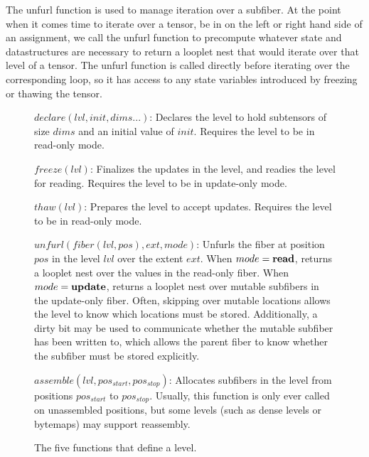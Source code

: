 The unfurl function is used to manage iteration over a subfiber. 
%
At the point when it comes time to iterate over a tensor, be in on the left or right hand
side of an assignment, we call the unfurl function to precompute whatever state
and datastructures are necessary to return a looplet nest that would iterate
over that level of a tensor.
%
The unfurl function is called directly before
iterating over the corresponding loop, so it has access to any state variables introduced
by freezing or thawing the tensor.

\begin{figure}[htbp]
    \footnotesize
    \raggedright
$declare(lvl, init, dims...)$: Declares the level to hold subtensors
of size $dims$ and an initial value of $init$. Requires the level to be in
read-only mode.

$freeze(lvl)$: Finalizes the updates in the level, and readies the
level for reading. Requires the level to be in update-only mode.

$thaw(lvl)$: Prepares the level to accept updates. Requires the level
to be in read-only mode.

$unfurl(fiber(lvl, pos), ext, mode)$: Unfurls the fiber at position
$pos$ in the level $lvl$ over the extent $ext$. When $mode = \text{\textbf{read}}$,
returns a looplet nest over the values in the read-only fiber.  When $mode =
\text{\textbf{update}}$, returns a looplet nest over mutable subfibers in the update-only
fiber. Often, skipping over mutable locations allows the level to know which
locations must be stored. Additionally, a dirty bit may be used to communicate
whether the mutable subfiber has been written to, which allows the parent fiber
to know whether the subfiber must be stored explicitly.

$assemble(lvl, pos_{start}, pos_{stop})$: Allocates subfibers in the
level from positions $pos_{start}$ to $pos_{stop}$. Usually, this function is
only ever called on unassembled positions, but some levels (such as dense levels
or bytemaps) may support reassembly.
\caption{The five functions that define a level.}
\end{figure}


